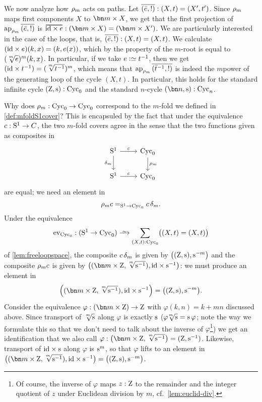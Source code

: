 We now analyze how $\rho_{m}$ acts on paths.
Let $\overline{({\bar {e}},{!})}:(X,t)=(X',t')$.
Since $\rho_{m}$ maps first components $X$ to $\bn m\times X$, we get that
the first projection of $\ap{\cdg{m}}\pathpair{\etop{e}}{!}$ is
$\overetop{\id\times e} : (\bn m\times X) = (\bn m\times X')$.
We are particularly interested in the case of the loops,
that is, $\overline{({\bar {e}},{!})}:(X,t)=(X,t)$.
We calculate $(\mathord{\mathrm{id}}\times e)(k,x) = (k,e(x))$,
which by the property of the $m$-root is equal to $(\sqrt[\uproot{2}m]e)^m(k,x)$.
In particular, if we take $e\defeq t^{-1}$,
then we get $(\id\times t^{-1}) = (\sqrt[\uproot{2}m]{t^{-1}})^m$, which means that
$\ap{\cdg{m}}\pathpair{\etop{t}^{-1}}{!}$ is indeed the $m$\th power of the
generating loop of the cycle $(X,t)$.
In particular, this holds for the standard infinite cycle $(\zet,\zs):\Cyc_0$
and the standard $n$-cycle $(\bn n,\zs):\Cyc_n$.

Why does $\rho_{m}:\mathrm{Cyc}_0\to\mathrm{Cyc}_0$
correspond to the $m$-fold \covering we defined in \cref{def:mfoldS1cover}?
This is encapsuled by the fact that under the equivalence $c:{\mathrm{S}^1}\to C$, the two $m$-fold covers agree in the sense that the two functions given as composites in
\[
  \begin{tikzcd}
    \Sc\ar[r,"c"]\ar[d,"\dg{m}"'] & \Cyc_0\ar[d,"\cdg{m}"] \\
    \Sc\ar[r,"c"] & \Cyc_0
  \end{tikzcd}
\]
are equal; we need an element in
\[
  \rho_{m}c=_{{\mathrm{S}^1}\to\mathrm{Cyc}_0}c\,\delta_{m}.
\]
Under the equivalence
\[
  \ev_{\Cyc_0}:(\Sc\to\Cyc_0)\we \sum_{(X,t):\Cyc_0}\bigl((X,t)=(X,t)\bigr)
\]
of \cref{lem:freeloopspace},
the composite $c\,\delta_{m}$ is given by $\bigl((\zet,\zs),\zs^{-m}\bigr)$
and the composite $\rho_{m}c$ is given by
$\bigl((\bn m\times\zet,\sqrt[\uproot{2}m]{\zs^{-1}}),\id\times\zs^{-1}\bigr)$:
we must produce an element in
\[
  \Bigl((\bn m\times\zet,\sqrt[\uproot{2}m]{\zs^{-1}}),\id\times\zs^{-1}\Bigr)
  = \bigl((\zet,\zs),\zs^{-m}\bigr).
\]
Consider the equivalence  $\varphi: (\bn m\times \zet)\to\zet$ with $\varphi(k,n)=k+mn$ discussed above.
Since transport of $\sqrt[\uproot{2}m]\zs$ along $\varphi$ is exactly $\zs$ (\ie $\varphi\!\sqrt[\uproot{2}m]\zs=\zs\varphi$;
note the way we formulate this so that we don't need to talk about the inverse of $\varphi$\footnote{%
  Of course, the inverse of $\varphi$ maps $z:\mathrm{Z}$ to the remainder and the integer quotient of $z$ under Euclidean division by $m$, cf.~\cref{lem:euclid-div}.})
we get an identification that we also call
$\varphi: \bigl(\bn m\times\zet,\sqrt[\uproot{2}m]{\zs^{-1}}\bigr)=(\zet,\zs^{-1})$.  Likewise, transport of $\id\times\zs$ along $\varphi$ is $\zs^m$,
so that $\varphi$ lifts to an element in
$\bigl((\bn m\times\zet,\sqrt[\uproot{2}m]{\zs^{-1}}), \id\times\zs^{-1}\bigr)
= \bigl((\zet,\zs),\zs^{-m}\bigr)$.

